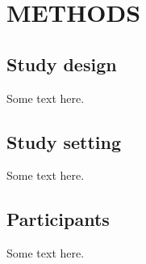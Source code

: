 \section{METHODS}
\vspace{1em}
\subsection{Study design}
Some text here.
\subsection{Study setting}
Some text here.
\subsection{Participants}
Some text here.





